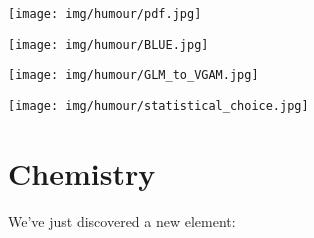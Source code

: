 	\begin{center}\underline{\hspace{5 cm}}\end{center}
	
	\begin{center}
	\texttt{[image: img/humour/pdf.jpg]}
	\end{center}
	
	\begin{center}
	\texttt{[image: img/humour/BLUE.jpg]}
	\end{center}
	
	\begin{center}\underline{\hspace{5 cm}}\end{center}
	
	\begin{center}
	\texttt{[image: img/humour/GLM\_to\_VGAM.jpg]}
	\end{center}
	
	\begin{center}
	\texttt{[image: img/humour/statistical\_choice.jpg]}
	\end{center}
		
	\pagebreak
	\section{Chemistry}

We've just discovered a new element:

